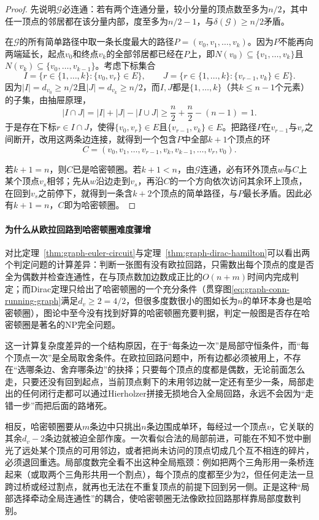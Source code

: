 \begin{proof}
先说明$\mathcal G$必连通：若有两个连通分量，较小分量的顶点数至多为$n/2$，其中任一顶点的邻居都在该分量内部，度至多为$n/2-1$，与$\delta(\mathcal G)\geq n/2$矛盾。

在$\mathcal G$的所有简单路径中取一条长度最大的路径$P=(v_0,v_1,\ldots,v_k)$。因为$P$不能再向两端延长，起点$v_0$和终点$v_k$的全部邻居都已经在$P$上，即$N(v_0)\subseteq\{v_1,\ldots,v_k\}$且$N(v_k)\subseteq\{v_0,\ldots,v_{k-1}\}$。考虑下标集合
\[
I=\bigl\{r\in\{1,\ldots,k\}:\{v_0,v_r\}\in E\bigr\},\qquad
J=\bigl\{r\in\{1,\ldots,k\}:\{v_{r-1},v_k\}\in E\bigr\}.
\]
因为$|I|=d_{v_0}\geq n/2$且$|J|=d_{v_k}\geq n/2$，而$I,J$都是$\{1,\ldots,k\}$（共$k\leq n-1$个元素）的子集，由抽屉原理，
\[
|I\cap J|=|I|+|J|-|I\cup J|\geq \frac{n}{2}+\frac{n}{2}-(n-1)=1.
\]
于是存在下标$r\in I\cap J$，使得$\{v_0,v_r\}\in E$且$\{v_{r-1},v_k\}\in E$。把路径$P$在$v_{r-1}$与$v_r$之间断开，改用这两条边连接，就得到一个包含$P$中全部$k+1$个顶点的环
\[
C=(v_0,v_1,\ldots,v_{r-1},v_k,v_{k-1},\ldots,v_r,v_0).
\]

若$k+1=n$，则$C$已是哈密顿圈。若$k+1<n$，由$\mathcal G$连通，必有环外顶点$w$与$C$上某个顶点$v_s$相邻；先从$w$沿边走到$v_s$，再沿$C$的一个方向依次访问其余环上顶点，在回到$v_s$之前停下，就得到一条含$k+2$个顶点的简单路径，与$P$最长矛盾。因此必有$k+1=n$，$C$即为哈密顿圈。
\end{proof}

\paragraph{为什么从欧拉回路到哈密顿圈难度骤增}
对比定理~\ref{thm:graph-euler-circuit}与定理~\ref{thm:graph-dirac-hamilton}可以看出两个判定问题的计算差异：判断一张图有没有欧拉回路，只需数出每个顶点的度是否全为偶数并检查连通性，在与顶点数加边数成正比的$O(n+m)$时间内完成判定；而Dirac定理只给出了哈密顿圈的一个充分条件（贯穿图\eqref{eq:graph-conn-running-graph}满足$d_v\geq 2=4/2$，但很多度数很小的图如长为$n$的单环本身也是哈密顿圈），图论中至今没有找到好算的哈密顿圈充要判据，判定一般图是否存在哈密顿圈是著名的NP完全问题。

这一计算复杂度差异的一个结构原因，在于“每条边一次”是局部守恒条件，而“每个顶点一次”是全局取舍条件。在欧拉回路问题中，所有边都必须被用上，不存在“选哪条边、舍弃哪条边”的抉择；只要每个顶点的度都是偶数，无论前面怎么走，只要还没有回到起点，当前顶点剩下的未用邻边就一定还有至少一条，局部走出的任何闭行走都可以通过Hierholzer拼接无损地合入全局回路，永远不会因为“走错一步”而把后面的路堵死。

相反，哈密顿圈要从$m$条边中只挑出$n$条边围成单环，每经过一个顶点$v$，它关联的其余$d_v-2$条边就被迫全部作废。一次看似合法的局部前进，可能在不知不觉中删光了远处某个顶点的可用邻边，或者把尚未访问的顶点切成几个互不相连的碎片，必须退回重选。局部度数完全看不出这种全局瓶颈：例如把两个三角形用一条桥连起来（或取两个三角形共用一个割点），每个顶点的度都至少为$2$，但任何走法一旦跨过桥或经过割点，就再也无法在不重复顶点的前提下回到另一侧。正是这种“局部选择牵动全局连通性”的耦合，使哈密顿圈无法像欧拉回路那样靠局部度数判别。
